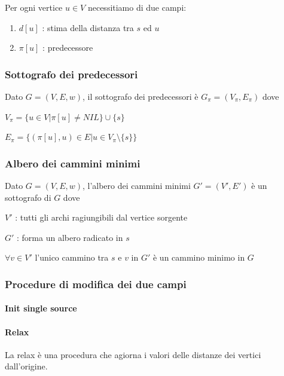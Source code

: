 \documentclass[tikz]{article}
\providecommand{\tightlist}{%
  \setlength{\itemsep}{0pt}\setlength{\parskip}{0pt}}
\let\oldparagraph\paragraph
\renewcommand{\paragraph}[1]{\oldparagraph{#1}\mbox{}}
\begin{document}
{{{Per ogni vertice $u \in V$ necessitiamo di due campi:}

\begin{enumerate}
\tightlist
\item
$d[u]$ : stima della distanza tra $s$ ed $u$
\item
$\pi[u]$ : predecessore
\end{enumerate}

\subsubsection{Sottografo dei predecessori}

{Dato $G=(V,E,w)$, il sottografo dei predecessori è $G_\pi=(V_\pi,E_\pi)$ dove}

$V_\pi=\{u \in V | \pi[u] \neq NIL\} \cup \{s\}$

$E_\pi=\{(\pi[u],u) \in E | u \in V_{\pi} \setminus \{s\}\}$

\subsubsection{Albero dei cammini minimi}

{Dato $G=(V,E,w)$, l'albero dei cammini minimi $G'=(V',E')$ è un sottografo di $G$ dove}

{$V'$ : tutti gli archi ragiungibili dal vertice sorgente}

{$G'$ : forma un albero radicato in $s$}

{$\forall v \in V'$ l'unico cammino tra $s$ e $v$ in $G'$ è un cammino minimo in $G$}

\subsubsection{Procedure di modifica dei due campi}

\paragraph{Init single source}



\paragraph{Relax}

La relax è una procedura che agiorna i valori  delle distanze dei vertici dall'origine.



}}
\end{document}
